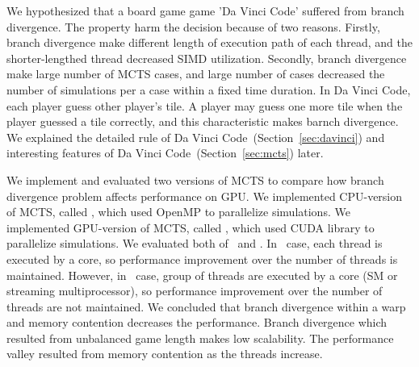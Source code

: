 We hypothesized that a board game game 'Da Vinci Code' suffered from branch divergence.
The property harm the decision because of two reasons.
Firstly, branch divergence make different length of execution path of each thread, and the shorter-lengthed thread decreased SIMD utilization.
Secondly, branch divergence make large number of MCTS cases, and large number of cases decreased the number of simulations per a case within a fixed time duration.
In Da Vinci Code, each player guess other player's tile.
A player may guess one more tile when the player guessed a tile correctly, and this characteristic makes barnch divergence.
We explained the detailed rule of Da Vinci Code~(Section~\ref{sec:davinci}) and interesting features of Da Vinci Code~(Section~\ref{sec:mcts}) later.


We implement and evaluated two versions of MCTS to compare how branch divergence problem affects performance on GPU.
We implemented CPU-version of MCTS, called \cpu, which used OpenMP to parallelize simulations.
We implemented GPU-version of MCTS, called \gpu, which used CUDA library to parallelize simulations.
We evaluated both of \cpu~and \gpu.
In \cpu~case, each thread is executed by a core, so performance improvement over the number of threads is maintained.
However, in \gpu~case, group of threads are executed by a core (SM or streaming multiprocessor), so performance improvement over the number of threads are not maintained.
We concluded that branch divergence within a warp and memory contention decreases the performance.
Branch divergence which resulted from unbalanced game length makes low scalability.
The performance valley resulted from memory contention as the threads increase. 


